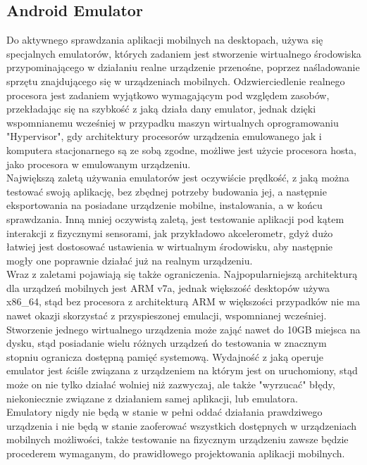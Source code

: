 \documentclass[12pt, a4paper]{article}
\begin{document}
\begin{sloppypar}
{  \subsection{Android Emulator}
  {
    Do aktywnego sprawdzania aplikacji mobilnych na desktopach, używa się
    specjalnych emulatorów, których zadaniem jest stworzenie wirtualnego środowiska
    przypominającego w działaniu realne urządzenie przenośne, poprzez naśladowanie
    sprzętu znajdującego się w urządzeniach mobilnych. Odzwierciedlenie realnego
    procesora jest zadaniem wyjątkowo wymagającym pod względem zasobów,
    przekładając się na szybkość z jaką działa dany emulator, jednak dzięki wspomnianemu
    wcześniej w przypadku maszyn wirtualnych oprogramowaniu "Hypervisor", gdy architektury
    procesorów urządzenia emulowanego jak i komputera stacjonarnego są ze sobą zgodne,
    możliwe jest użycie procesora hosta, jako procesora w emulowanym urządzeniu.\\
    Największą zaletą używania emulatorów jest oczywiście prędkość, z jaką można testować
    swoją aplikację, bez zbędnej potrzeby budowania jej, a następnie eksportowania
    na posiadane urządzenie mobilne, instalowania, a w końcu sprawdzania. Inną mniej
    oczywistą zaletą, jest testowanie aplikacji pod kątem interakcji z fizycznymi
    sensorami, jak przykładowo akcelerometr, gdyż dużo łatwiej jest dostosować ustawienia
    w wirtualnym środowisku, aby następnie mogły one poprawnie działać już na realnym
    urządzeniu.\\
    Wraz z zaletami pojawiają się także ograniczenia. Najpopularniejszą architekturą
    dla urządzeń mobilnych jest ARM v7a, jednak większość desktopów używa x86\_64, stąd
    bez procesora z architekturą ARM w większości przypadków nie ma nawet okazji skorzystać
    z przyspieszonej emulacji, wspomnianej wcześniej. Stworzenie jednego wirtualnego
    urządzenia może zająć nawet do 10GB miejsca na dysku, stąd posiadanie wielu różnych
    urządzeń do testowania w znacznym stopniu ogranicza dostępną pamięć systemową.
    Wydajność z jaką operuje emulator jest ściśle związana z urządzeniem na którym jest
    on uruchomiony, stąd może on nie tylko działać wolniej niż zazwyczaj, ale także
    "wyrzucać" błędy, niekoniecznie związane z działaniem samej aplikacji, lub emulatora.\\
    Emulatory nigdy nie będą w stanie w pełni oddać działania prawdziwego urządzenia i
    nie będą w stanie zaoferować wszystkich dostępnych w urządzeniach mobilnych możliwości,
    także testowanie na fizycznym urządzeniu zawsze będzie procederem wymaganym, do
    prawidłowego projektowania aplikacji mobilnych.
  }
}
\end{sloppypar}
\end{document}
